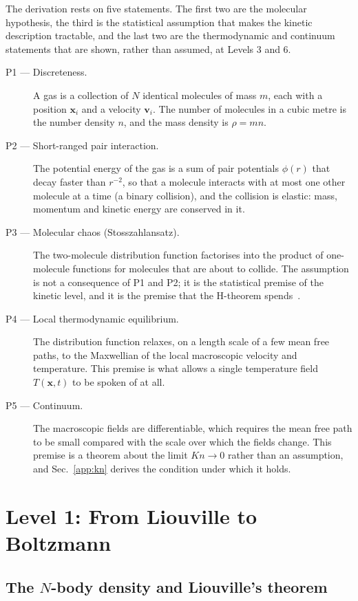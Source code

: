 The derivation rests on five statements. The first two are the molecular hypothesis, the third is the statistical assumption that makes the kinetic description tractable, and the last two are the thermodynamic and continuum statements that are shown, rather than assumed, at Levels 3 and 6.

\begin{description}
    \item[P1 --- Discreteness.] A gas is a collection of $N$ identical molecules of mass $m$, each with a position $\mathbf{x}_i$ and a velocity $\mathbf{v}_i$. The number of molecules in a cubic metre is the number density $n$, and the mass density is $\rho = mn$.
    \item[P2 --- Short-ranged pair interaction.] The potential energy of the gas is a sum of pair potentials $\phi(r)$ that decay faster than $r^{-2}$, so that a molecule interacts with at most one other molecule at a time (a binary collision), and the collision is elastic: mass, momentum and kinetic energy are conserved in it.
    \item[P3 --- Molecular chaos (Stosszahlansatz).] The two-molecule distribution function factorises into the product of one-molecule functions for molecules that are about to collide. The assumption is not a consequence of P1 and P2; it is the statistical premise of the kinetic level, and it is the premise that the H-theorem spends~\cite{chapman1970kinetic}.
    \item[P4 --- Local thermodynamic equilibrium.] The distribution function relaxes, on a length scale of a few mean free paths, to the Maxwellian of the local macroscopic velocity and temperature. This premise is what allows a single temperature field $T(\mathbf{x},t)$ to be spoken of at all.
    \item[P5 --- Continuum.] The macroscopic fields are differentiable, which requires the mean free path to be small compared with the scale over which the fields change. This premise is a theorem about the limit $Kn \to 0$ rather than an assumption, and Sec.~\ref{app:kn} derives the condition under which it holds.
\end{description}

\section{Level 1: From Liouville to Boltzmann}
\label{app:boltzmann}

\subsection{The \texorpdfstring{$N$}{N}-body density and Liouville's theorem}

